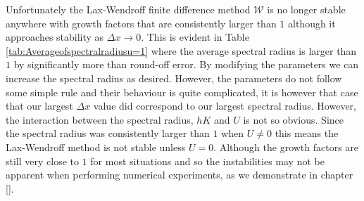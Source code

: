 Unfortunately the Lax-Wendroff finite difference method $\mathcal{W}$ is no longer stable anywhere with growth factors that are consistently larger than $1$ although it approaches stability as $\Delta x \rightarrow 0$. This is evident in Table \ref{tab:Averageofspectralradiusu=1} where the average spectral radius is larger than $1$ by significantly more than round-off error. By modifying the parameters we can increase the spectral radius as desired. However, the parameters do not follow some simple rule and their behaviour is quite complicated, it is however that case that our largest $\Delta x$ value did correspond to our largest spectral radius. However, the interaction between the spectral radius, $hK$ and $U$ is not so obvious. Since the spectral radius was consistently larger than $1$ when $U \neq 0$ this means the Lax-Wendroff method is not stable unless $U=0$. Although the growth factors are still very close to $1$ for most situations and so the instabilities may not be apparent when performing numerical experiments, as we demonstrate in chapter []. 
